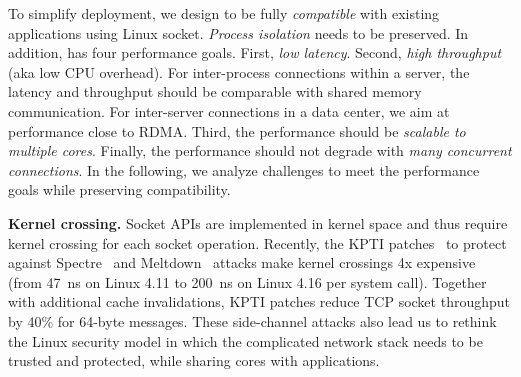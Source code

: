 





To simplify deployment, we design \sys to be fully \textit{compatible} with existing applications using Linux socket. \textit{Process isolation} needs to be preserved. In addition, \sys has four performance goals. First, \textit{low latency}. Second, \textit{high throughput} (aka low CPU overhead). For inter-process connections within a server, the latency and throughput should be comparable with shared memory communication. For inter-server connections in a data center, we aim at performance close to RDMA. Third, the performance should be \textit{scalable to multiple cores}. Finally, the performance should not degrade with \textit{many concurrent connections}.
In the following, we analyze challenges to meet the performance goals while preserving compatibility.

\textbf{Kernel crossing.}
Socket APIs are implemented in kernel space and thus require kernel crossing for each socket operation. Recently, the KPTI patches~\cite{kpti} to protect against Spectre~\cite{Kocher2018spectre} and Meltdown~\cite{Lipp2018meltdown} attacks make kernel crossings 4x expensive (from 47~ns on Linux 4.11 to 200~ns on Linux 4.16 per system call). Together with additional cache invalidations, KPTI patches reduce TCP socket throughput by 40\% for 64-byte messages. These side-channel attacks also lead us to rethink the Linux security model in which the complicated network stack needs to be trusted and protected, while sharing cores with applications.

